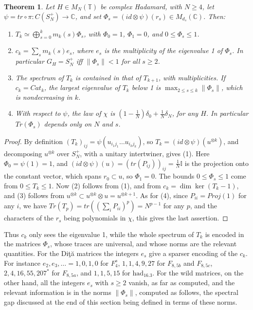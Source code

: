 \documentclass[11pt]{amsart}
\newtheorem{theorem}{Theorem}[section]
\newcommand{\T}{\mathbb T}
\begin{document}
\begin{theorem}\label{thm:jw}
Let $H\in M_N(\T)$ be complex Hadamard, with $N\geq4$, let $\psi=tr\circ\pi:C(S_N^+)\to\mathbb C$, and set $\Phi_s=(id\otimes\psi)(r_s)\in M_{d_s}(\mathbb C)$. Then:
\begin{enumerate}
\item $T_k\simeq\bigoplus_{s=0}^km_k(s)\Phi_s$, with $\Phi_0=1$, $\Phi_1=0$, and $0\leq\Phi_s\leq1$.

\item $c_k=\sum_sm_k(s)e_s$, where $e_s$ is the multiplicity of the eigenvalue 1 of $\Phi_s$. In particular $G_H=S_N^+$ iff $\|\Phi_s\|<1$ for all $s\geq2$.

\item The spectrum of $T_k$ is contained in that of $T_{k+1}$, with multiplicities. If $c_k=Cat_k$, the largest eigenvalue of $T_k$ below 1 is $\max_{2\leq s\leq k}\|\Phi_s\|$, which is nondecreasing in $k$.

\item With respect to $\psi$, the law of $\chi$ is $(1-\frac{1}{N})\delta_0+\frac{1}{N}\delta_N$, for any $H$. In particular $Tr(\Phi_s)$ depends only on $N$ and $s$.
\end{enumerate}
\end{theorem}

\begin{proof}
By definition $(T_k)_{ij}=\psi(u_{i_1j_1}\ldots u_{i_kj_k})$, so $T_k=(id\otimes\psi)(u^{\otimes k})$, and decomposing $u^{\otimes k}$ over $S_N^+$, with a unitary intertwiner, gives (1). Here $\Phi_0=\psi(1)=1$, and $(id\otimes\psi)(u)=(tr(P_{ij}))_{ij}=\frac{1}{N}\mathbb I$ is the projection onto the constant vector, which spans $r_0\subset u$, so $\Phi_1=0$. The bounds $0\leq\Phi_s\leq1$ come from $0\leq T_k\leq1$. Now (2) follows from (1), and from $c_k=\dim\ker(T_k-1)$, and (3) follows from $u^{\otimes k}\subset u^{\otimes k}\otimes u=u^{\otimes k+1}$. As for (4), since $P_{ii}=Proj(1)$ for any $i$, we have $Tr(T_p)=tr((\sum_iP_{ii})^p)=N^{p-1}$ for any $p$, and the characters of the $r_s$ being polynomials in $\chi$, this gives the last assertion.
\end{proof}

Thus $c_k$ only sees the eigenvalue 1, while the whole spectrum of $T_k$ is encoded in the matrices $\Phi_s$, whose traces are universal, and whose norms are the relevant quantities. For the Di\c t\u a matrices the integers $e_s$ give a sparser encoding of the $c_k$. For instance $e_2,e_3,\ldots=1,0,1,0$ for $F_4^s$, $1,1,4,9,27$ for $F_{8,5b}$ and $F_{8,5c}$, $2,4,16,55,207^*$ for $F_{8,5a}$, and $1,1,5,15$ for $\mathrm{had}_{16.3}$. For the wild matrices, on the other hand, all the integers $e_s$ with $s\geq2$ vanish, as far as computed, and the relevant information is in the norms $\|\Phi_s\|$, computed as follows, the spectral gap discussed at the end of this section being defined in terms of these norms.
\end{document}
